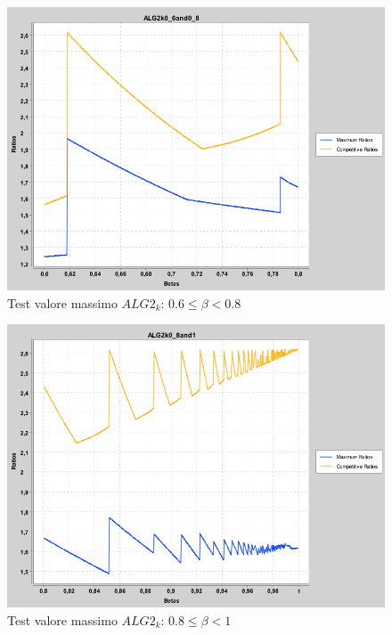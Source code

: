 \documentclass[12pt]{article}
\begin{document}
\begin{figure}[H]
\caption{Test valore massimo $ALG2_{k}$: $0.6 \leq \beta < 0.8$}
\centering
\includegraphics[scale=0.4]{max/ALG2k0_6and0_8.png}
\end{figure}
\begin{figure}[H]
\caption{Test valore massimo $ALG2_{k}$: $0.8 \leq \beta < 1$}
\centering
\includegraphics[scale=0.4]{max/ALG2k0_8and1.png}
\end{figure}
\end{document}
